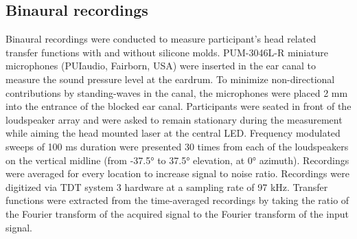 \documentclass[preprint]{JASA}
\begin{document}
\subsection{Binaural recordings}
Binaural recordings were conducted to measure participant’s head related transfer functions with and without silicone molds. PUM-3046L-R miniature microphones (PUIaudio, Fairborn, USA) were inserted in the ear canal to measure the sound pressure level at the eardrum. To minimize non-directional contributions by standing-waves in the canal, the microphones were placed 2 mm into the entrance of the blocked ear canal. Participants were seated in front of the loudspeaker array and were asked to remain stationary during the measurement while aiming the head mounted laser at the central LED. Frequency modulated sweeps of 100 ms duration were presented 30 times from each of the loudspeakers on the vertical midline (from -37.5° to 37.5° elevation, at 0° azimuth). Recordings were averaged for every location to increase signal to noise ratio. Recordings were digitized via TDT system 3 hardware at a sampling rate of 97 kHz. Transfer functions were extracted from the time-averaged recordings by taking the ratio of the Fourier transform of the acquired signal to the Fourier transform of the input signal.
\end{document}
